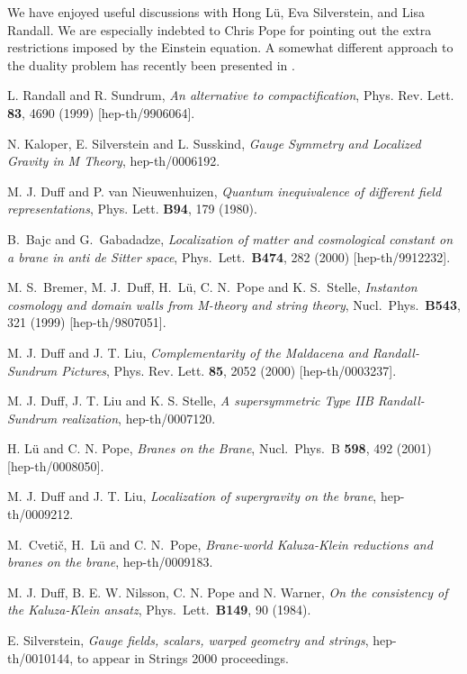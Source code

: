 \documentclass[a4paper,12pt]{article}
\begin{document}
\bigskip

We have enjoyed useful discussions with Hong L\"u, Eva Silverstein, and
Lisa Randall. We are especially indebted to Chris Pope for pointing
out the extra restrictions imposed by the Einstein equation. A somewhat
different approach to the duality problem has recently been presented in
\cite{Silverstein}.

\bigskip

\begin{thebibliography}{99}


L. Randall and R. Sundrum,
{\sl An alternative to compactification},
Phys. Rev. Lett. {\bf 83}, 4690 (1999) [hep-th/9906064].

N. Kaloper, E. Silverstein and L. Susskind,
{\sl Gauge Symmetry and Localized Gravity in M Theory},
hep-th/0006192.

M. J. Duff and P. van Nieuwenhuizen,
{\sl Quantum inequivalence of different field representations},
Phys. Lett. {\bf B94}, 179 (1980).

B.~Bajc and G.~Gabadadze,
{\sl Localization of matter and cosmological constant on a brane in anti
de Sitter space},
Phys.\ Lett.\ {\bf B474}, 282 (2000) [hep-th/9912232].

M. S.~Bremer, M. J.~Duff, H.~L\"u, C. N.~Pope and K. S.~Stelle,
{\sl Instanton cosmology and domain walls from M-theory and string theory},
Nucl.\ Phys.\ {\bf B543}, 321 (1999) [hep-th/9807051].

M. J. Duff and J. T. Liu,
{\sl Complementarity of the Maldacena and Randall-Sundrum Pictures},
Phys. Rev. Lett. {\bf 85}, 2052 (2000) [hep-th/0003237].

M. J. Duff, J. T. Liu and K. S. Stelle,
{\sl A supersymmetric Type IIB Randall-Sundrum realization},
hep-th/0007120.

H. L\"u and C. N. Pope, {\sl Branes on the Brane},
Nucl.\ Phys.\ B {\bf 598}, 492 (2001) [hep-th/0008050].

M. J. Duff and J. T. Liu,
{\sl Localization of supergravity on the brane},
hep-th/0009212.

M.~Cveti\v{c}, H.~L\"u and C. N.~Pope,
{\sl Brane-world Kaluza-Klein reductions and branes on the brane},
hep-th/0009183.

M. J. Duff, B. E. W. Nilsson, C. N. Pope and N. Warner,
{\sl On the consistency of the Kaluza-Klein ansatz},
Phys.\ Lett.\ {\bf B149}, 90 (1984).

E. Silverstein,
{\sl Gauge fields, scalars, warped geometry and strings},
hep-th/0010144, to appear in Strings 2000 proceedings.

\end{thebibliography}
\end{document}
